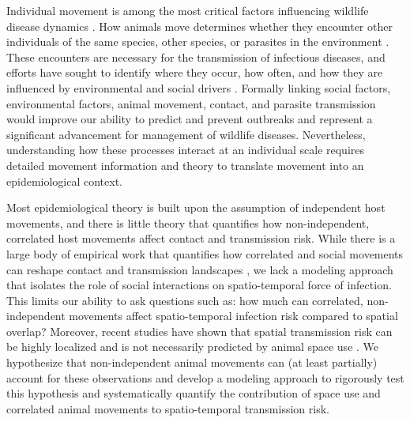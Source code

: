 \documentclass[letterpaper]{article}
\begin{document}
Individual movement is among the most critical factors influencing wildlife disease dynamics \citep{Dougherty2018,Manlove2022}. 
How animals move determines whether they encounter other individuals of the same species, other species, or parasites in the environment \citep{Martinez-Garcia2020,Das2023}. 
These encounters are necessary for the transmission of infectious diseases, and efforts have sought to identify where they occur, how often, and how they are influenced by environmental and social drivers \citep{Titcomb2021,Dougherty2022,Webber2023}. 
Formally linking social factors, environmental factors, animal movement, contact, and parasite transmission would improve our ability to predict and prevent outbreaks and represent a significant advancement for management of wildlife diseases.  
Nevertheless, understanding how these processes interact at an individual scale requires detailed movement information and theory to translate movement into an epidemiological context.

Most epidemiological theory is built upon the assumption of independent host movements, and there is little theory that quantifies how non-independent, correlated host movements affect contact and transmission risk. While there is a large body of empirical work that quantifies how correlated and social movements can reshape contact and transmission landscapes \citep[e.g.,][]{Kjaer2008,Grear2010,Schauber2015a}, we lack a modeling approach that isolates the role of social interactions on spatio-temporal force of infection. This limits our ability to ask questions such as: how much can correlated, non-independent movements affect spatio-temporal infection risk compared to spatial overlap? Moreover, recent studies have shown that spatial transmission risk can be highly localized \citep{Albery2021} and is not necessarily predicted by animal space use \citep{Yang2023a}. We hypothesize that non-independent animal movements can (at least partially) account for these observations and develop a modeling approach to rigorously test this hypothesis and systematically quantify the contribution of space use and correlated animal movements to spatio-temporal transmission risk.
\end{document}
